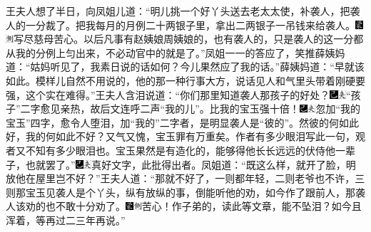 王夫人想了半日，向凤姐儿道：``明儿挑一个好丫头送去老太太使，补袭人，把袭人的一分裁了。把我每月的月例二十两银子里，拿出二两银子一吊钱来给袭人。{\includegraphics[width=3mm]{../Images/00006}\includegraphics[width=3mm]{../Images/00011}\footnotesize \kaishu 写尽慈母苦心。}以后凡事有赵姨娘周姨娘的，也有袭人的，只是袭人的这一分都从我的分例上匀出来，不必动官中的就是了。''凤姐一一的答应了，笑推薛姨妈道：``姑妈听见了，我素日说的话如何？今儿果然应了我的话。''薛姨妈道：``早就该如此。模样儿自然不用说的，他的那一种行事大方，说话见人和气里头带着刚硬要强，这个实在难得。''王夫人含泪说道：``你们那里知道袭人那孩子的好处？{\includegraphics[width=3mm]{../Images/00003}\includegraphics[width=3mm]{../Images/00012}\footnotesize \kaishu ``孩子''二字愈见亲热，故后文连呼二声``我的儿''。}比我的宝玉强十倍！{\includegraphics[width=3mm]{../Images/00003}\includegraphics[width=3mm]{../Images/00012}\footnotesize \kaishu 忽加``我的宝玉''四字，愈令人堕泪，加``我的''二字者，是明显袭人是``彼的''。然彼的何如此好，我的何如此不好？又气又愧，宝玉罪有万重矣。作者有多少眼泪写此一句，观者又不知有多少眼泪也。}宝玉果然是有造化的，能够得他长长远远的伏侍他一辈子，也就罢了。''{\includegraphics[width=3mm]{../Images/00003}\includegraphics[width=3mm]{../Images/00012}\footnotesize \kaishu 真好文字，此批得出者。}凤姐道：``既这么样，就开了脸，明放他在屋里岂不好？''王夫人道：``那就不好了，一则都年轻，二则老爷也不许，三则那宝玉见袭人是个丫头，纵有放纵的事，倒能听他的劝，如今作了跟前人，那袭人该劝的也不敢十分劝了。{\includegraphics[width=3mm]{../Images/00006}\includegraphics[width=3mm]{../Images/00011}\footnotesize \kaishu 苦心！作子弟的，读此等文章，能不坠泪？}如今且浑着，等再过二三年再说。''

